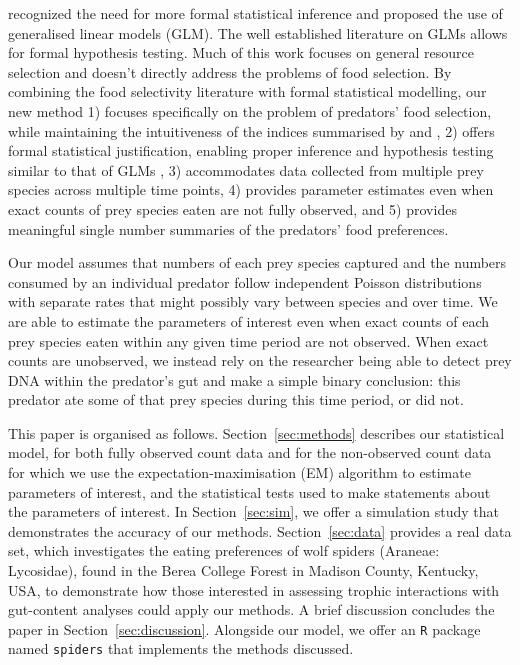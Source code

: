 \documentclass[smallextended]{svjour3}
\begin{document}
\citet{Manly:2002} recognized the need for more formal statistical inference and proposed the use of generalised linear models (GLM).  The well established literature on GLMs allows for formal hypothesis testing.  Much of this work focuses on general resource selection and doesn't directly address the problems of food selection.  By combining the food selectivity literature with formal statistical modelling, our new method 1) focuses specifically on the problem of predators' food selection, while maintaining the intuitiveness of the indices summarised by \citet{Lechowicz:1982} and \citet{Manly:2002}, 2) offers formal statistical justification, enabling proper inference and hypothesis testing similar to that of GLMs \citep{Manly:2002}, 3) accommodates data collected from multiple prey species across multiple time points, 4) provides parameter estimates even when exact counts of prey species eaten are not fully observed, and 5) provides meaningful single number summaries of the predators' food preferences.

Our model assumes that numbers of each prey species captured and the numbers consumed by an individual predator follow independent Poisson distributions with separate rates that might possibly vary between species and over time.  We are able to estimate the parameters of interest even when exact counts of each prey species eaten within any given time period are not observed.  When exact counts are unobserved, we instead rely on the researcher being able to detect prey DNA within the predator's gut \citep{Schmidt:2014,Raso:2014,Madduppa:2014} and make a simple binary conclusion: this predator ate some of that prey species during this time period, or did not.  

This paper is organised as follows.  Section~\ref{sec:methods} describes our statistical model, for both fully observed count data and for the non-observed count data for which we use the expectation-maximisation (EM) algorithm to estimate parameters of interest, and the statistical tests used to make statements about the parameters of interest.  In Section~\ref{sec:sim}, we offer a simulation study that demonstrates the accuracy of our methods.  Section~\ref{sec:data} provides a real data set, which investigates the eating preferences of wolf spiders (Araneae: Lycosidae), found in the Berea College Forest in Madison County, Kentucky, USA, to demonstrate how those interested in assessing trophic interactions with gut-content analyses could apply our methods.  A brief discussion concludes the paper in Section~\ref{sec:discussion}.  Alongside our model, we offer an \texttt{R} \citep{Core-Team:2014} package named \texttt{spiders} that implements the methods discussed.  
\end{document}

